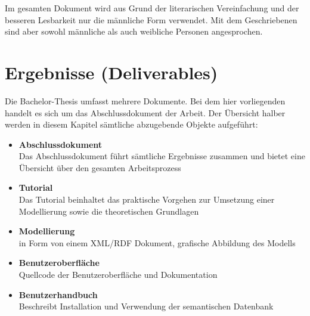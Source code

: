 Im gesamten Dokument wird aus Grund der literarischen Vereinfachung und der besseren Lesbarkeit nur die männliche Form verwendet. Mit dem Geschriebenen sind aber sowohl männliche als auch weibliche Personen angesprochen.

\section{Ergebnisse (Deliverables)}
\label{sec:admin_ergebniss}
Die Bachelor-Thesis umfasst mehrere Dokumente. Bei dem hier vorliegenden handelt es sich um das Abschlussdokument der Arbeit. Der Übersicht halber werden in diesem Kapitel sämtliche abzugebende Objekte aufgeführt:
\begin{itemize}
	\item \textbf{Abschlussdokument} \\
        Das Abschlussdokument führt sämtliche Ergebnisse zusammen und bietet eine Übersicht über den gesamten Arbeitsprozess
	\item \textbf{Tutorial} \\
        Das Tutorial beinhaltet das praktische Vorgehen zur Umsetzung einer Modellierung sowie die theoretischen Grundlagen
	\item \textbf{Modellierung} \\
        in Form von einem XML/RDF Dokument, grafische Abbildung des Modells
	\item \textbf{Benutzeroberfläche} \\
        Quellcode der Benutzeroberfläche und Dokumentation
	\item \textbf{Benutzerhandbuch} \\
        Beschreibt Installation und Verwendung der semantischen Datenbank

\end{itemize}
